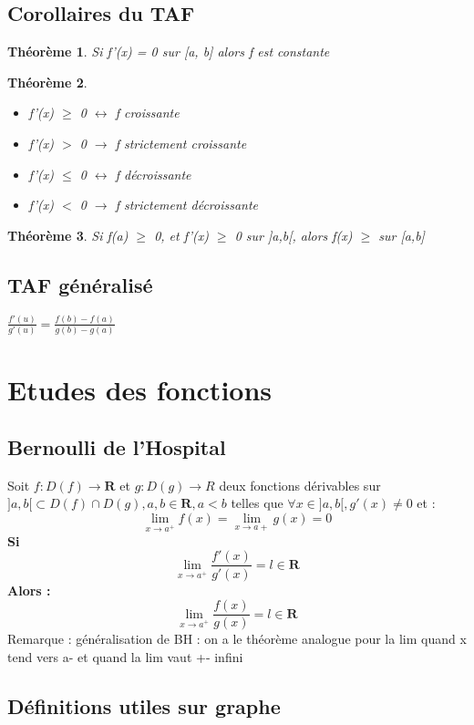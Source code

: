 \documentclass{article}
\newtheorem{theorem}{Théorème}
\begin{document}
\subsection{Corollaires du TAF}
\begin{theorem}
    Si f'(x) = 0 sur [a, b] alors f est constante
\end{theorem}
\begin{theorem}   \
\begin{itemize}
    \item f'(x) $\geq$ 0 $\leftrightarrow$ f croissante
    \item f'(x) $>$ 0 $\rightarrow$ f strictement croissante
    \item f'(x) $\leq$ 0 $\leftrightarrow$ f décroissante
    \item f'(x) $<$ 0 $\rightarrow$ f strictement décroissante
\end{itemize}
\end{theorem}
\begin{theorem}
    Si f(a) $\geq$ 0, et f'(x) $\geq$ 0 sur ]a,b[, alors f(x) $\geq$ sur [a,b]
\end{theorem}
\subsection{TAF généralisé} 
$\frac{f'(u)}{g'(u)} = \frac{f(b) - f(a)}{g(b) - g(a)}$
\section{Etudes des fonctions}

\subsection{Bernoulli de l'Hospital}

Soit $ f : D(f) \to \mathbf{R} $ et $ g : D(g) \to {R} $ deux fonctions dérivables sur $ ]a, b[ \subset D(f) \cap D(g), a, b \in \mathbf{R}, a < b $ telles que $ \forall x \in ]a, b[, g'(x) \neq 0 $ et :
\[ \lim_{x\to{a^+}}f(x) = \lim_{x\to{a+}}g(x) = 0\]
\textbf{Si} \[ \lim_{x\to{a^+}}\frac{f'(x)}{g'(x)} = l \in \mathbf{R} \]
\textbf{Alors :}
\[ \lim_{x\to{a^+}}\frac{f(x)}{g(x)} = l \in \mathbf{R} \]
Remarque : généralisation de BH : on a le théorème analogue pour la lim quand x tend vers a- et quand la lim vaut +- infini 

\subsection{Définitions utiles sur graphe}
\end{document}
